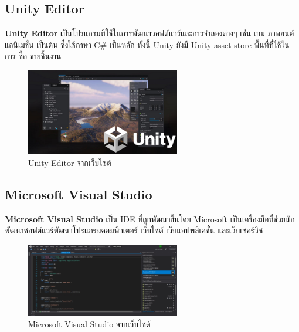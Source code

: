 \subsection{Unity Editor}
\subsubitem \textbf{Unity Editor} \cite{unity:program} เป็นโปรแกรมที่ใช้ในการพัฒนาวอฟต์แวร์และการจำลองต่างๆ เช่น เกม ภาพยนต์ แอนิเมชั่น เป็นต้น ซึ่งใช้ภาษา C$\#$ เป็นหลัก ทั้งนี้ Unity ยังมี Unity asset store พื้นที่ที่ใช้ในการ ซื้อ-ขายชิ้นงาน
\begin{figure}[h]
  \centering
  \includegraphics[width=0.6\textwidth, height=0.2\textheight]{Images/unity-engine-landscape-swimlane.png}
  \caption{Unity Editor จากเว็บไซต์}\label{Unity}
\end{figure}

\subsection{Microsoft Visual Studio}
\subsubitem \textbf{Microsoft Visual Studio} \cite{microsoft-visual-studios:program} เป็น IDE ที่ถูกพัฒนาขึ้นโดย Microsoft เป็นเครื่องมือที่ช่วยนักพัฒนาซอฟต์แวร์พัฒนาโปรแกรมคอมพิวเตอร์ เว็บไซต์ เว็บแอปพลิเคชั่น และเว็บเซอร์วิซ
\begin{figure}[h]
  \centering
  \includegraphics[width=0.6\textwidth, height=0.2\textheight]{Images/python-development-cropped.jpg}
  \caption{Microsoft Visual Studio จากเว็บไซต์}\label{Microsoft}
\end{figure}

